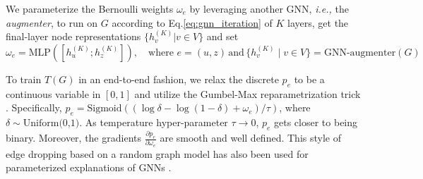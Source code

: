 We parameterize the Bernoulli weights $\omega_e$ by leveraging another GNN, \textit{i.e.,} the \emph{augmenter}, to run on $G$ according to Eq.\ref{eq:gnn_iteration} of $K$ layers, get the final-layer node representations $\{h_v^{(K)}|v\in V\}$ and set
\begin{equation}\label{eq:w_e}
    \omega_{e} = \text{MLP} ([h_u^{(K)};h_z^{(K)}]), \quad \text{where }  e=(u,z) \,\text{and}\,\{ h_v^{(K)} \mid v \in V \} = \text{GNN-augmenter}(G)
\end{equation}

To train $T(G)$ in an end-to-end fashion, %
we relax the discrete $p_{e}$ to be a continuous variable in $[0,1]$ and utilize the Gumbel-Max reparametrization trick \cite{maddison2016concrete, jang2016categorical}. Specifically, %
$p_{e} = \text{Sigmoid}((\log \delta - \log(1-\delta) + \omega_{e})/\tau)$, where $\delta \sim \text{Uniform(0,1)}$. 
As temperature hyper-parameter $\tau \rightarrow 0$, $p_{e}$ gets closer to being binary. Moreover, the gradients $\frac{\partial p_{e}}{\partial \omega_{e}}$ are smooth and well defined. This style of edge dropping based on a random graph model has also been used for parameterized explanations of GNNs \cite{luo2020parameterized}. \vspace{-1mm}

